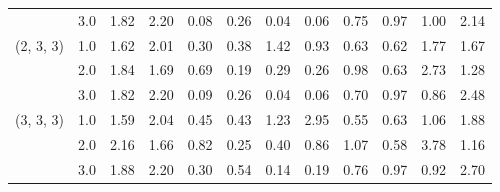 \begin{tabular}{llrrrrrrrrrr}
          & 3.0 &   1.82 &  2.20 &    0.08 &  0.26 &    0.04 &  0.06 &  0.75 &  0.97 &  1.00 &  2.14 \\
(2, 3, 3) & 1.0 &   1.62 &  2.01 &    0.30 &  0.38 &    1.42 &  0.93 &  0.63 &  0.62 &  1.77 &  1.67 \\
          & 2.0 &   1.84 &  1.69 &    0.69 &  0.19 &    0.29 &  0.26 &  0.98 &  0.63 &  2.73 &  1.28 \\
          & 3.0 &   1.82 &  2.20 &    0.09 &  0.26 &    0.04 &  0.06 &  0.70 &  0.97 &  0.86 &  2.48 \\
(3, 3, 3) & 1.0 &   1.59 &  2.04 &    0.45 &  0.43 &    1.23 &  2.95 &  0.55 &  0.63 &  1.06 &  1.88 \\
          & 2.0 &   2.16 &  1.66 &    0.82 &  0.25 &    0.40 &  0.86 &  1.07 &  0.58 &  3.78 &  1.16 \\
          & 3.0 &   1.88 &  2.20 &    0.30 &  0.54 &    0.14 &  0.19 &  0.76 &  0.97 &  0.92 &  2.70 \\
\bottomrule
\end{tabular}
